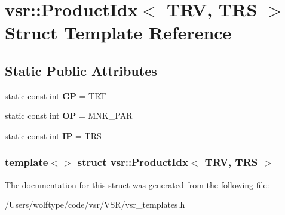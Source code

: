 \hypertarget{structvsr_1_1_product_idx_3_01_t_r_v_00_01_t_r_s_01_4}{\section{vsr\-:\-:Product\-Idx$<$ T\-R\-V, T\-R\-S $>$ Struct Template Reference}
\label{structvsr_1_1_product_idx_3_01_t_r_v_00_01_t_r_s_01_4}
}
\subsection*{Static Public Attributes}
\begin{DoxyCompactItemize}
\item 
\hypertarget{structvsr_1_1_product_idx_3_01_t_r_v_00_01_t_r_s_01_4_afeac1f778a211f0ed8ea2df575e86818}{static const int {\bfseries G\-P} = T\-R\-T}\label{structvsr_1_1_product_idx_3_01_t_r_v_00_01_t_r_s_01_4_afeac1f778a211f0ed8ea2df575e86818}

\item 
\hypertarget{structvsr_1_1_product_idx_3_01_t_r_v_00_01_t_r_s_01_4_a8c640027e3031755ebb2be746eb1a49e}{static const int {\bfseries O\-P} = M\-N\-K\-\_\-\-P\-A\-R}\label{structvsr_1_1_product_idx_3_01_t_r_v_00_01_t_r_s_01_4_a8c640027e3031755ebb2be746eb1a49e}

\item 
\hypertarget{structvsr_1_1_product_idx_3_01_t_r_v_00_01_t_r_s_01_4_adc9d270affd99bcbc082f90ca40479df}{static const int {\bfseries I\-P} = T\-R\-S}\label{structvsr_1_1_product_idx_3_01_t_r_v_00_01_t_r_s_01_4_adc9d270affd99bcbc082f90ca40479df}

\end{DoxyCompactItemize}
\subsubsection*{template$<$$>$ struct vsr\-::\-Product\-Idx$<$ T\-R\-V, T\-R\-S $>$}



The documentation for this struct was generated from the following file\-:\begin{DoxyCompactItemize}
\item 
/\-Users/wolftype/code/vsr/\-V\-S\-R/vsr\-\_\-templates.\-h\end{DoxyCompactItemize}

